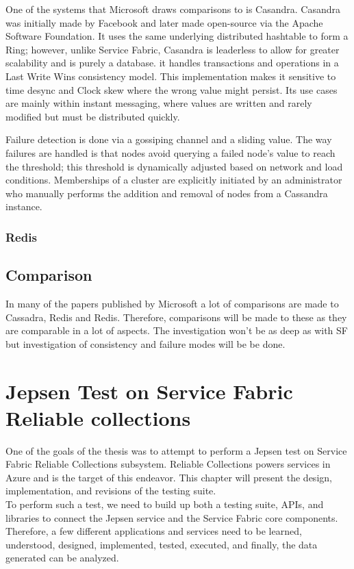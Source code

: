 \documentclass[a4paper,10pt,titlepage]{report}
\begin{document}
One of the systems that Microsoft draws comparisons to is Casandra. Casandra was initially made by Facebook and later made open-source via the Apache Software Foundation. It uses the same underlying distributed hashtable to form a Ring; however, unlike Service Fabric, Casandra is leaderless to allow for greater scalability and is purely a database. it handles transactions and operations in a Last Write Wins consistency model. This implementation makes it sensitive to time desync and Clock skew where the wrong value might persist. Its use cases are mainly within instant messaging, where values are written and rarely modified but must be distributed quickly. 

Failure detection is done via a gossiping channel and a sliding value. The way failures are handled is that nodes avoid querying a failed node's value to reach the threshold; this threshold is dynamically adjusted based on network and load conditions. Memberships of a cluster are explicitly initiated by an administrator who manually performs the addition and removal of nodes from a Cassandra instance.\cite{Cassandra}
    
    

    \subsection{Redis}



    \section{Comparison}
    In many of the papers published by Microsoft a lot of comparisons are made to Cassadra, Redis and Redis. Therefore, comparisons will be made to these as they are comparable in a lot of aspects. The investigation won't be as deep as with SF but investigation of consistency and failure modes will be be done.


    \chapter{Jepsen Test on Service Fabric Reliable collections}

    One of the goals of the thesis was to attempt to perform a Jepsen test on Service Fabric Reliable Collections subsystem. Reliable Collections powers services in Azure and is the target of this endeavor. 
    This chapter will present the design, implementation, and revisions of the testing suite. \\
    \vspace{5mm}
    To perform such a test, we need to build up both a testing suite, APIs, and libraries to connect the Jepsen service and the Service Fabric core components. Therefore, a few different applications and services need to be learned, understood, designed, implemented, tested, executed, and finally, the data generated can be analyzed.
    
\end{document}

